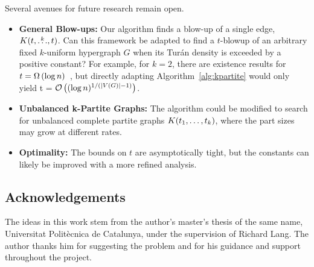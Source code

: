 Several avenues for future research remain open.
\begin{itemize}
    \item \textbf{General Blow-ups:} Our algorithm finds a blow-up of a single edge, $K(t, \overset{k}{\dots}, t)$.
    Can this framework be adapted to find a $t$-blowup of an arbitrary fixed $k$-uniform hypergraph $G$ when its Tur\'{a}n density is exceeded by a positive constant?
    For example, for $k=2$, there are existence results for $t = \Omega\left(\log n\right)$~\cite{bollobas1973structure}, but directly adapting Algorithm~\ref{alg:kpartite} would only
    yield t = $\mathcal{O}\left((\log n)^{1/(|V(G)| - 1)}\right)$.
    \item \textbf{Unbalanced k-Partite Graphs:} The algorithm could be modified to search for unbalanced complete partite graphs $K(t_1, \dots, t_k)$, where the part sizes may grow at different rates.
    \item \textbf{Optimality:} The bounds on $t$ are asymptotically tight, but the constants can likely be improved with a more refined analysis.
\end{itemize}

\subsection*{Acknowledgements}

The ideas in this work stem from the author's master's thesis of the same name,
Universitat Polit\`{e}cnica de Catalunya,
under the supervision of Richard Lang.
The author thanks him for suggesting the problem and for his guidance and support throughout the project.

